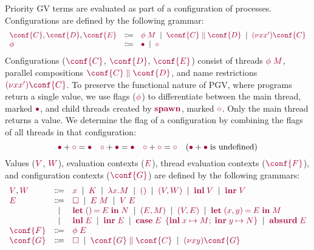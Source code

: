 \documentclass[main.tex]{subfiles}
\begin{document}
Priority GV terms are evaluated as part of a configuration of processes. Configurations are defined by the following grammar:
\[
\begin{array}[t]{lcl}
    \tm{\conf{C}}, \tm{\conf{D}}, \tm{\conf{E}}
  & \Coloneqq & \tm{\phi\;M}
    \sep        \tm{\ppar{\conf{C}}{\conf{D}}}
    \sep        \tm{\res{x}{x'}{\conf{C}}}
  \\
  \tm{\phi}
  & \Coloneqq & \tm{\main}
    \sep        \tm{\child}
\end{array}
\]
Configurations ($\tm{\conf{C}}$, $\tm{\conf{D}}$, $\tm{\conf{E}}$) consist of threads $\tm{\phi\;M}$, parallel compositions $\tm{\ppar{\conf{C}}{\conf{D}}}$, and name restrictions $\tm{\res{x}{x'}{\conf{C}}}$. To preserve the functional nature of PGV, where programs return a single value, we use flags ($\tm{\phi}$) to differentiate between the main thread, marked $\tm{\main}$, and child threads created by $\tm{\spawn}$, marked $\tm{\child}$. Only the main thread returns a value. We determine the flag of a configuration by combining the flags of all threads in that configuration:
\[
  \tm{\main}  + \tm{\child} = \tm{\main}
  \quad
  \tm{\child} + \tm{\main}  = \tm{\main}
  \quad
  \tm{\child} + \tm{\child} = \tm{\child}
  \quad
  (\tm{\main}  + \tm{\main} \; \text{is undefined})
\]
Values ($\tm{V}$, $\tm{W}$), evaluation contexts ($\tm{E}$), thread evaluation contexts ($\tm{\conf{F}}$), and configuration contexts ($\tm{\conf{G}}$) are defined by the following grammars:
\[
\begin{array}[t]{lcl}
  \tm{V}, \tm{W}
  & \Coloneqq & \tm{x}
    \sep        \tm{K}
    \sep        \tm{\lambda x.M}
    \sep        \tm{\unit}
    \sep        \tm{\pair{V}{W}}
    \sep        \tm{\inl{V}}
    \sep        \tm{\inr{V}} \\
  \tm{E}
  & \Coloneqq & \tm{\hole}
    \sep        \tm{E\;M}
    \sep        \tm{V\;E} \\
  & \sep      & \tm{\letunit{E}{N}}
    \sep        \tm{\pair{E}{M}}
    \sep        \tm{\pair{V}{E}}
    \sep        \tm{\letpair{x}{y}{E}{M}} \\
  & \sep      & \tm{\inl{E}}
    \sep        \tm{\inr{E}}
    \sep        \tm{\casesum{E}{x}{M}{y}{N}}
    \sep        \tm{\absurd{E}} \\
  \tm{\conf{F}}
  & \Coloneqq & \tm{\phi\;E}
  \\
  \tm{\conf{G}}
  & \Coloneqq & \tm{\hole}
    \sep        \tm{\ppar{\conf{G}}{\conf{C}}}
    \sep        \tm{\res{x}{y}{\conf{G}}}
\end{array}
\]
\end{document}
